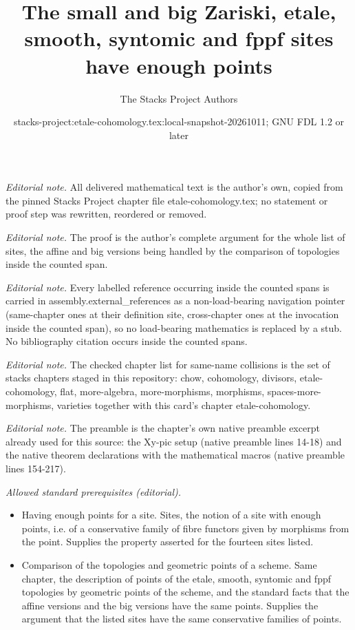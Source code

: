 \documentclass[10pt,a4paper]{amsart}
\title{The small and big Zariski, etale, smooth, syntomic and fppf sites have enough points}
\author{The Stacks Project Authors}
\date{stacks-project:etale-cohomology.tex:local-snapshot-20261011; GNU FDL 1.2 or later}
\theoremstyle{plain}
\theoremstyle{definition}
\theoremstyle{remark}
\numberwithin{equation}{subsection}
\begin{document}
\maketitle
\noindent\textit{Editorial note.} All delivered mathematical text is the author's own, copied from the pinned Stacks Project chapter file etale-cohomology.tex; no statement or proof step was rewritten, reordered or removed.\par\medskip
\noindent\textit{Editorial note.} The proof is the author's complete argument for the whole list of sites, the affine and big versions being handled by the comparison of topologies inside the counted span.\par\medskip
\noindent\textit{Editorial note.} Every labelled reference occurring inside the counted spans is carried in assembly.external\_references as a non-load-bearing navigation pointer (same-chapter ones at their definition site, cross-chapter ones at the invocation inside the counted span), so no load-bearing mathematics is replaced by a stub. No bibliography citation occurs inside the counted spans.\par\medskip
\noindent\textit{Editorial note.} The checked chapter list for same-name collisions is the set of stacks chapters staged in this repository: chow, cohomology, divisors, etale-cohomology, flat, more-algebra, more-morphisms, morphisms, spaces-more-morphisms, varieties together with this card's chapter etale-cohomology.\par\medskip
\noindent\textit{Editorial note.} The preamble is the chapter's own native preamble excerpt already used for this source: the Xy-pic setup (native preamble lines 14-18) and the native theorem declarations with the mathematical macros (native preamble lines 154-217).\par\medskip
\noindent\textit{Allowed standard prerequisites (editorial).}\begin{itemize}
\item Having enough points for a site. Sites, the notion of a site with enough points, i.e. of a conservative family of fibre functors given by morphisms from the point. Supplies the property asserted for the fourteen sites listed.
\item Comparison of the topologies and geometric points of a scheme. Same chapter, the description of points of the etale, smooth, syntomic and fppf topologies by geometric points of the scheme, and the standard facts that the affine versions and the big versions have the same points. Supplies the argument that the listed sites have the same conservative families of points.
\end{itemize}\medskip
\end{document}
